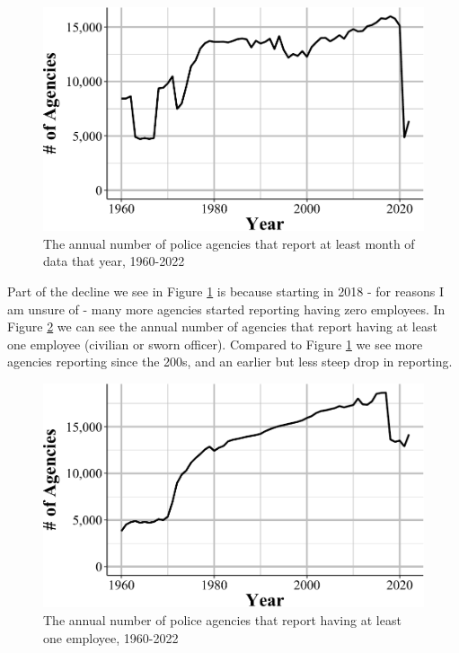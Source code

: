 \documentclass[
  12pt,
  openany]{book}
\begin{document}
\begin{figure}

{\centering \includegraphics[width=0.9\linewidth]{07_leoka_files/figure-latex/leokaAgencies-1} 

}

\caption{The annual number of police agencies that report at least month of data that year, 1960-2022}\label{fig:leokaAgencies}
\end{figure}

Part of the decline we see in Figure \ref{fig:leokaAgencies} is because starting in 2018 - for reasons I am unsure of - many more agencies started reporting having zero employees. In Figure \ref{fig:leokaAgenciesEmployees} we can see the annual number of agencies that report having at least one employee (civilian or sworn officer). Compared to Figure \ref{fig:leokaAgencies} we see more agencies reporting since the 200s, and an earlier but less steep drop in reporting.

\begin{figure}

{\centering \includegraphics[width=0.9\linewidth]{07_leoka_files/figure-latex/leokaAgenciesEmployees-1} 

}

\caption{The annual number of police agencies that report having at least one employee, 1960-2022}\label{fig:leokaAgenciesEmployees}
\end{figure}
\end{document}
